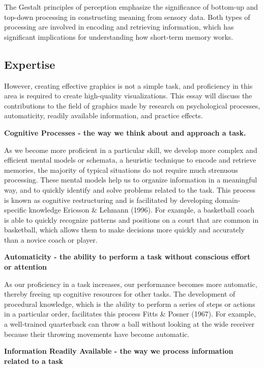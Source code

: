 \documentclass[print]{nuthesis}
\begin{document}
The Gestalt principles of perception emphasize the significance of bottom-up and top-down processing in constructing meaning from sensory data.
Both types of processing are involved in encoding and retrieving information, which has significant implications for understanding how short-term memory works.

\hypertarget{expertise}{%
\subsection{Expertise}\label{expertise}}

However, creating effective graphics is not a simple task, and proficiency in this area is required to create high-quality visualizations.
This essay will discuss the contributions to the field of graphics made by research on psychological processes, automaticity, readily available information, and practice effects.

\textbf{Cognitive Processes - the way we think about and approach a task.}

As we become more proficient in a particular skill, we develop more complex and efficient mental models or schemata, a heuristic technique to encode and retrieve memories, the majority of typical situations do not require much strenuous processing.
These mental models help us to organize information in a meaningful way, and to quickly identify and solve problems related to the task.
This process is known as cognitive restructuring and is facilitated by developing domain-specific knowledge Ericsson \& Lehmann (1996).
For example, a basketball coach is able to quickly recognize patterns and positions on a court that are common in basketball, which allows them to make decisions more quickly and accurately than a novice coach or player.

\textbf{Automaticity - the ability to perform a task without conscious effort or attention}

As our proficiency in a task increases, our performance becomes more automatic, thereby freeing up cognitive resources for other tasks.
The development of procedural knowledge, which is the ability to perform a series of steps or actions in a particular order, facilitates this process Fitts \& Posner (1967).
For example, a well-trained quarterback can throw a ball without looking at the wide receiver because their throwing movements have become automatic.

\textbf{Information Readily Available - the way we process information related to a task}
\end{document}
